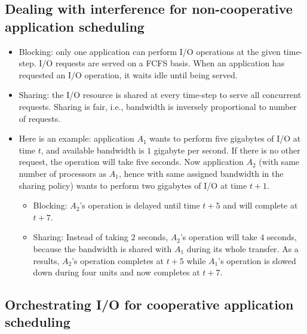 \subsection{Dealing with interference for non-cooperative application scheduling}
\begin{itemize}
  \item Blocking: only one application can perform I/O operations at the given time-step.
  I/O requests are served on a FCFS basis. When an application has requested an I/O
  operation, it waits idle until being served. 
  \item Sharing: the I/O resource is shared at every time-step to serve all concurrent requests. Sharing is fair, i.e., bandwidth is inversely proportional to number of requests.
  \item Here is an example:
  application $A_{1}$ wants to perform five gigabytes of I/O at time $t$,
  and available bandwidth is
  $1$ gigabyte per second. If there is no other request, the operation will take five seconds.
  Now application $A_{2}$ (with same number of processors as $A_{1}$, hence with same assigned bandwidth in the sharing policy) wants to perform two gigabytes of I/O at time $t+1$.
  \begin{itemize}
  \item Blocking: $A_{2}$'s operation is delayed until time $t+5$ and will complete at $t+7$.
  \item Sharing: Instead of taking $2$ seconds, $A_{2}$'s operation will take $4$ seconds, because the bandwidth is shared with $A_{1}$ during its whole transfer. As a results, $A_{2}$'s operation completes at $t+5$ while $A_{1}$'s  operation is slowed down during four units and now completes at $t+7$.
  \end{itemize}
\end{itemize}

\subsection{Orchestrating I/O for cooperative application scheduling}


